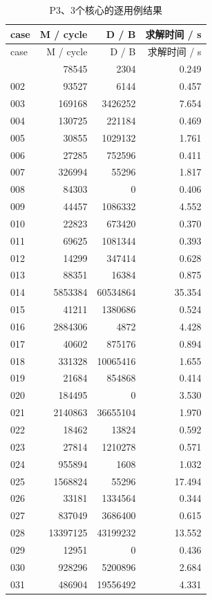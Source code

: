 \documentclass[anonymous,notoc]{gmcm2026}
\begin{document}
\begin{longtable}{lrrr}
\caption{P3、3个核心的逐用例结果}\\
\toprule
case & M / cycle & D / B & 求解时间 / s\\\midrule
\endfirsthead
\toprule
case & M / cycle & D / B & 求解时间 / s\\\midrule
\endhead
\bottomrule\endfoot
001 & 78545 & 2304 & 0.249 \\
002 & 93527 & 6144 & 0.457 \\
003 & 169168 & 3426252 & 7.654 \\
004 & 130725 & 221184 & 0.469 \\
005 & 30855 & 1029132 & 1.761 \\
006 & 27285 & 752596 & 0.411 \\
007 & 326994 & 55296 & 1.817 \\
008 & 84303 & 0 & 0.406 \\
009 & 44457 & 1086332 & 4.552 \\
010 & 22823 & 673420 & 0.370 \\
011 & 69625 & 1081344 & 0.393 \\
012 & 14299 & 347414 & 0.628 \\
013 & 88351 & 16384 & 0.875 \\
014 & 5853384 & 60534864 & 35.354 \\
015 & 41211 & 1380686 & 0.524 \\
016 & 2884306 & 4872 & 4.428 \\
017 & 40602 & 875176 & 0.894 \\
018 & 331328 & 10065416 & 1.655 \\
019 & 21684 & 854868 & 0.414 \\
020 & 184495 & 0 & 3.530 \\
021 & 2140863 & 36655104 & 1.970 \\
022 & 18462 & 13824 & 0.592 \\
023 & 27814 & 1210278 & 0.571 \\
024 & 955894 & 1608 & 1.032 \\
025 & 1568824 & 55296 & 17.494 \\
026 & 33181 & 1334564 & 0.344 \\
027 & 837049 & 3686400 & 0.615 \\
028 & 13397125 & 43199232 & 13.552 \\
029 & 12951 & 0 & 0.436 \\
030 & 928296 & 5200896 & 2.684 \\
031 & 486904 & 19556492 & 4.331 \\

\end{longtable}
\end{document}
